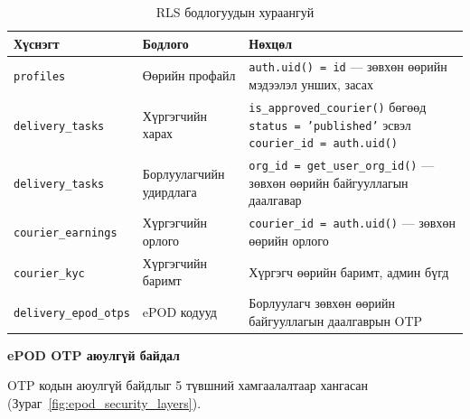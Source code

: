 \begin{table}[H]
\centering
\renewcommand{\arraystretch}{1.3}
\caption{RLS бодлогуудын хураангуй}
\begin{tabular}{|p{3cm}|p{3cm}|p{7.5cm}|}
\hline
\textbf{Хүснэгт} & \textbf{Бодлого} & \textbf{Нөхцөл} \\
\hline
\texttt{profiles} & Өөрийн профайл & \texttt{auth.uid() = id} — зөвхөн өөрийн мэдээлэл унших, засах \\
\hline
\texttt{delivery\_tasks} & Хүргэгчийн харах & \texttt{is\_approved\_courier()} бөгөөд \texttt{status = 'published'} эсвэл \texttt{courier\_id = auth.uid()} \\
\hline
\texttt{delivery\_tasks} & Борлуулагчийн удирдлага & \texttt{org\_id = get\_user\_org\_id()} — зөвхөн өөрийн байгууллагын даалгавар \\
\hline
\texttt{courier\_earnings} & Хүргэгчийн орлого & \texttt{courier\_id = auth.uid()} — зөвхөн өөрийн орлого \\
\hline
\texttt{courier\_kyc} & Хүргэгчийн баримт & Хүргэгч өөрийн баримт, админ бүгд \\
\hline
\texttt{delivery\_epod\_otps} & ePOD кодууд & Борлуулагч зөвхөн өөрийн байгууллагын даалгаврын OTP \\
\hline
\end{tabular}
\end{table}

\textbf{ePOD OTP аюулгүй байдал}

OTP кодын аюулгүй байдлыг 5 түвшний хамгаалалтаар хангасан (Зураг~\ref{fig:epod_security_layers}).

